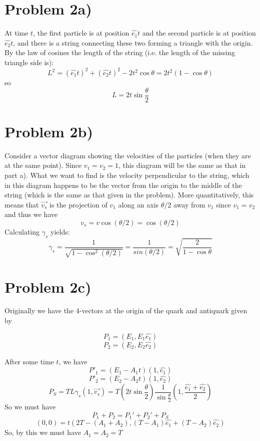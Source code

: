 \section*{Problem 2a)}
At time $t$, the first particle is at position $\hat{e_1}t$ and the second particle is at position $\hat{e_2}t$, and there is a string connecting these two forming a triangle with the origin. By the law of cosines the length of the string (i.e. the length of the missing triangle side is):
\[ L^2 = (\hat{e_1}t)^2 + (\hat{e_2}t)^2 - 2 t^2 \cos \theta = 2t^2 (1 - \cos\theta) \]
so 
\[ L = 2t\sin \frac{\theta}{2} \]
\section*{Problem 2b)}
Consider a vector diagram showing the velocities of the particles (when they are at the same point). Since $v_1=v_2=1$, this diagram will be the same as that in part a). What we want to find is the velocity perpendicular to the string, which in this diagram happens to be the vector from the origin to the middle of the string (which is the same as that given in the problem). More quantitatively, this means that $\vec{v_s}$ is the projection of $v_1$ along an axis $\theta/2$ away from $v_1$ since $v_1=v_2$ and thus we have
\[ v_s = v\cos(\theta/2) = \cos(\theta/2) \]
Calculating $\gamma_s$ yields:
\[ \gamma_s = \frac{1}{\sqrt{1-\cos^2\left(\theta/2\right)}} = \frac{1}{sin\left(\theta/2\right)} = \sqrt{\frac{2}{1-\cos\theta}} \]
\section*{Problem 2c)}
Originally we have the 4-vectors at the origin of the quark and antiquark given by
\begin{multicols}{2}
\noindent
\[ P_1 = (E_1, E_1 \hat{e_1}) \]
\[ P_2 = (E_2, E_2 \hat{e_2}) \]
\end{multicols}
After some time $t$, we have
\[ P'_1 = (E_1-A_1t)(1,\hat{e_1}) \]
\[ P'_2 = (E_2-A_2t)(1,\hat{e_2}) \]
\[ P_S = T L \gamma_s (1,\vec{v_s}) = T \left(2 t \sin\frac{\theta}{2}\right) \frac{1}{\sin \frac{\theta}{2}} \left(1,\frac{\hat{e_1}+\hat{e_2}}{2} \right) \]
So we must have
\[ P_1 + P_2 = P_1' + P_2' + P_S \]
\[ (0,0) = t (2T-(A_1+A_2), (T-A_1)\hat{e_1} + (T-A_2) \hat{e_2}) 
\]
So, by this we must have $A_1 = A_2 = T$
